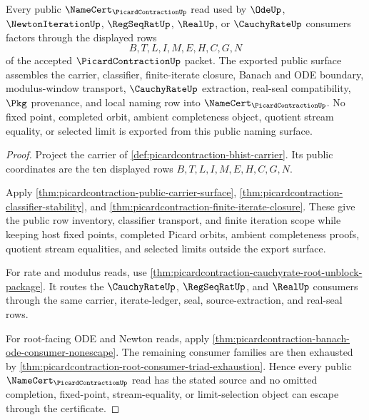 \begin{theorem}
\label{thm:picardcontraction-public-namecert-export}
Every public $\NameCert_{\PicardContractionUp}$ read used by
$\OdeUp$, $\NewtonIterationUp$, $\RegSeqRatUp$, $\RealUp$, or
$\CauchyRateUp$ consumers factors through the displayed rows
$$
B,T,L,I,M,E,H,C,G,N
$$
of the accepted $\PicardContractionUp$ packet. The exported public surface
assembles the carrier, classifier, finite-iterate closure, Banach and ODE
boundary, modulus-window transport, $\CauchyRateUp$ extraction, real-seal
compatibility, $\Pkg$ provenance, and local naming row into
$\NameCert_{\PicardContractionUp}$. No fixed point, completed orbit, ambient
completeness object, quotient stream equality, or selected limit is exported
from this public naming surface.
\end{theorem}
\begin{proof}
Project the carrier of \autoref{def:picardcontraction-bhist-carrier}. Its
public coordinates are the ten displayed rows $B,T,L,I,M,E,H,C,G,N$.

Apply \autoref{thm:picardcontraction-public-carrier-surface},
\autoref{thm:picardcontraction-classifier-stability}, and
\autoref{thm:picardcontraction-finite-iterate-closure}. These give the public
row inventory, classifier transport, and finite iteration scope while keeping
host fixed points, completed Picard orbits, ambient completeness proofs,
quotient stream equalities, and selected limits outside the export surface.

For rate and modulus reads, use
\autoref{thm:picardcontraction-cauchyrate-root-unblock-package}. It routes the
$\CauchyRateUp$, $\RegSeqRatUp$, and $\RealUp$ consumers through the same
carrier, iterate-ledger, seal, source-extraction, and real-seal rows.

For root-facing ODE and Newton reads, apply
\autoref{thm:picardcontraction-banach-ode-consumer-nonescape}. The remaining
consumer families are then exhausted by
\autoref{thm:picardcontraction-root-consumer-triad-exhaustion}. Hence every
public $\NameCert_{\PicardContractionUp}$ read has the stated source and no
omitted completion, fixed-point, stream-equality, or limit-selection object can
escape through the certificate.
\end{proof}

